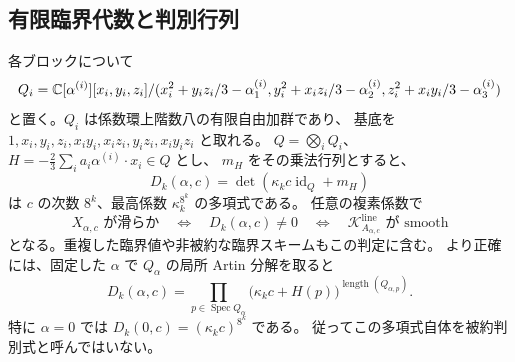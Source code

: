 

\subsection{有限臨界代数と判別行列}

\begin{corollary}[階数 $8^k$ の厳密な判別行列]
\label{cmm:cor:determinantal-discriminant}
各ブロックについて
\[
 Q_i=\mathbb C[\alpha^{(i)}][x_i,y_i,z_i]/
 (x_i^2+y_iz_i/3-\alpha^{(i)}_1,
  y_i^2+x_iz_i/3-\alpha^{(i)}_2,
  z_i^2+x_iy_i/3-\alpha^{(i)}_3)
\]
と置く。$Q_i$ は係数環上階数八の有限自由加群であり、
基底を $1,x_i,y_i,z_i,x_iy_i,x_iz_i,y_iz_i,x_iy_iz_i$ と取れる。
$Q=\bigotimes_i Q_i$、$H=-\frac23\sum_i a_i\alpha^{(i)}\cdot x_i\in Q$ とし、
$m_H$ をその乗法行列とすると、
\begin{equation}\label{cmm:eq:determinant}
 D_k(\alpha,c)=\det(\kappa_kc\operatorname{id}_Q+m_H)
\end{equation}
は $c$ の次数 $8^k$、最高係数 $\kappa_k^{8^k}$ の多項式である。
任意の複素係数で
\[
 X_{\alpha,c}\text{ が滑らか}
 \quad\Longleftrightarrow\quad D_k(\alpha,c)\ne0
 \quad\Longleftrightarrow\quad
 \mathcal K^{\mathrm{line}}_{A_{\alpha,c}}\text{ が smooth}
\]
となる。重複した臨界値や非被約な臨界スキームもこの判定に含む。
より正確には、固定した $\alpha$ で $Q_\alpha$ の局所 Artin 分解を取ると
\begin{equation}\label{cmm:eq:determinant-multiplicities}
 D_k(\alpha,c)=
 \prod_{p\in\operatorname{Spec}Q_\alpha}
       \bigl(\kappa_kc+H(p)\bigr)^{\operatorname{length}(Q_{\alpha,p})}.
\end{equation}
特に $\alpha=0$ では $D_k(0,c)=(\kappa_kc)^{8^k}$ である。
従ってこの多項式自体を被約判別式と呼んではいない。
\end{corollary}

